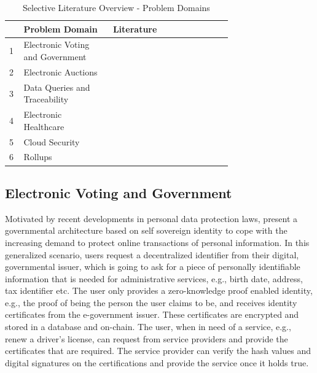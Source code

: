 \setlength{\tabcolsep}{2ex}
\renewcommand{\arraystretch}{1.5}%
\begin{table}[ht]
	\centering
	    \caption{Selective Literature Overview - Problem Domains}
		\begin{tabular}{| m{0.02\linewidth} | m{0.3\linewidth} | m{0.4\linewidth}|}
		\hline
		\textbf{} & \textbf{Problem Domain} & \textbf{Literature} \\ \hline
            1 & Electronic Voting and \newline Government & \citet{Bansod, Guo, Querejeta} \\  \hline
            2 & Electronic Auctions & \citet{LiXue, WangZhaoMu} \\ \hline 
            3 & Data Queries and \newline Traceability & \citet{Godden, XueWang}  \\  \hline
            4 & Electronic Healthcare & \citet{LuongPark, ZHENG, WangEtAl, Huangetal} \\  \hline 
            5 & Cloud Security & \citet{LiuWangPengXing, Major, Munivel, Kanagamani} \\  \hline 
            6 & Rollups & \citet{chen2022review, scalingintro, zksyncintro, buterinrollups} \\  \hline 
	\end{tabular}
\label{tab:domains}
\end{table}

\subsection{Electronic Voting and Government}
Motivated by recent developments in personal data protection laws, \citet{Bansod} present a governmental architecture based on self sovereign identity to cope with the increasing demand to protect online transactions of personal information. In this generalized scenario, users request a decentralized identifier from their digital, governmental issuer, which is going to ask for a piece of personally identifiable information that is needed for administrative services, e.g., birth date, address, tax identifier etc. The user only provides a zero-knowledge proof enabled identity, e.g., the proof of being the person the user claims to be, and receives identity certificates from the e-government issuer. These certificates are encrypted and stored in a database and on-chain. The user, when in need of a service, e.g., renew a driver's license, can request from service providers and provide the certificates that are required. The service provider can verify the hash values and digital signatures on the certifications and provide the service once it holds true.

